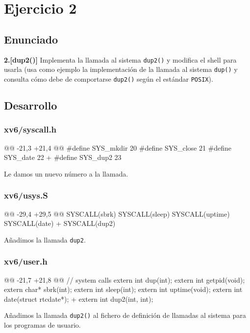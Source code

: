 \section{Ejercicio 2}
\subsection{Enunciado}
\begin{ejer}
    \textbf{2.[dup2()]} Implementa la llamada al sistema \texttt{dup2()} y modifica el shell
para usarla (usa como ejemplo la implementación de la llamada al sistema \texttt{dup()} y consulta cómo
debe de comportarse \texttt{dup2()} según el estándar \texttt{POSIX}).
\end{ejer}
\subsection{Desarrollo}
\subsubsection{xv6/syscall.h}
\begin{listing}
@@ -21,3 +21,4 @@
    #define SYS_mkdir  20
    #define SYS_close  21
    #define SYS_date   22
+   #define SYS_dup2   23
\end{listing}
\par Le damos un nuevo número a la llamada.

\subsubsection{xv6/usys.S}
\begin{listing}
@@ -29,4 +29,5 @@
    SYSCALL(sbrk)
    SYSCALL(sleep)
    SYSCALL(uptime)
    SYSCALL(date)
+   SYSCALL(dup2)
\end{listing}
\par Añadimos la llamada \texttt{dup2}.

\subsubsection{xv6/user.h}
\begin{listing}
@@ -21,7 +21,8 @@ 
// system calls
    extern int dup(int);
    extern int getpid(void);
    extern char* sbrk(int);
    extern int sleep(int);
    extern int uptime(void);
    extern int date(struct rtcdate*);
+   extern int dup2(int, int);
\end{listing}
\par Añadimos la llamada \texttt{dup2()} al fichero de definición de llamadas 
al sistema para los programas de usuario.

